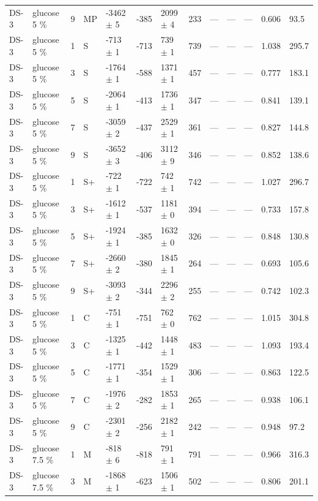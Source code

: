 \documentclass[11pt,a4paper]{article}
\begin{document}
\begin{landscape}
{\begin{longtable}{@{}lllllllllllll@{}}
DS-3 & glucose 5 \% & 9 & MP & -3462 $\pm$ 5 & -385 & 2099 $\pm$ 4 & 233 & --- & --- & --- & 0.606 & 93.5 \\
DS-3 & glucose 5 \% & 1 & S & -713 $\pm$ 1 & -713 & 739 $\pm$ 1 & 739 & --- & --- & --- & 1.038 & 295.7 \\
DS-3 & glucose 5 \% & 3 & S & -1764 $\pm$ 1 & -588 & 1371 $\pm$ 1 & 457 & --- & --- & --- & 0.777 & 183.1 \\
DS-3 & glucose 5 \% & 5 & S & -2064 $\pm$ 1 & -413 & 1736 $\pm$ 1 & 347 & --- & --- & --- & 0.841 & 139.1 \\
DS-3 & glucose 5 \% & 7 & S & -3059 $\pm$ 2 & -437 & 2529 $\pm$ 1 & 361 & --- & --- & --- & 0.827 & 144.8 \\
DS-3 & glucose 5 \% & 9 & S & -3652 $\pm$ 3 & -406 & 3112 $\pm$ 9 & 346 & --- & --- & --- & 0.852 & 138.6 \\
DS-3 & glucose 5 \% & 1 & S+ & -722 $\pm$ 1 & -722 & 742 $\pm$ 1 & 742 & --- & --- & --- & 1.027 & 296.7 \\
DS-3 & glucose 5 \% & 3 & S+ & -1612 $\pm$ 1 & -537 & 1181 $\pm$ 0 & 394 & --- & --- & --- & 0.733 & 157.8 \\
DS-3 & glucose 5 \% & 5 & S+ & -1924 $\pm$ 1 & -385 & 1632 $\pm$ 0 & 326 & --- & --- & --- & 0.848 & 130.8 \\
DS-3 & glucose 5 \% & 7 & S+ & -2660 $\pm$ 2 & -380 & 1845 $\pm$ 1 & 264 & --- & --- & --- & 0.693 & 105.6 \\
DS-3 & glucose 5 \% & 9 & S+ & -3093 $\pm$ 2 & -344 & 2296 $\pm$ 2 & 255 & --- & --- & --- & 0.742 & 102.3 \\
DS-3 & glucose 5 \% & 1 & C & -751 $\pm$ 1 & -751 & 762 $\pm$ 0 & 762 & --- & --- & --- & 1.015 & 304.8 \\
DS-3 & glucose 5 \% & 3 & C & -1325 $\pm$ 1 & -442 & 1448 $\pm$ 1 & 483 & --- & --- & --- & 1.093 & 193.4 \\
DS-3 & glucose 5 \% & 5 & C & -1771 $\pm$ 1 & -354 & 1529 $\pm$ 1 & 306 & --- & --- & --- & 0.863 & 122.5 \\
DS-3 & glucose 5 \% & 7 & C & -1976 $\pm$ 2 & -282 & 1853 $\pm$ 1 & 265 & --- & --- & --- & 0.938 & 106.1 \\
DS-3 & glucose 5 \% & 9 & C & -2301 $\pm$ 2 & -256 & 2182 $\pm$ 1 & 242 & --- & --- & --- & 0.948 & 97.2 \\
DS-3 & glucose 7.5 \% & 1 & M & -818 $\pm$ 6 & -818 & 791 $\pm$ 1 & 791 & --- & --- & --- & 0.966 & 316.3 \\
DS-3 & glucose 7.5 \% & 3 & M & -1868 $\pm$ 1 & -623 & 1506 $\pm$ 1 & 502 & --- & --- & --- & 0.806 & 201.1 \\

\end{longtable}}
\end{landscape}
\end{document}
